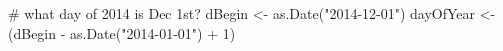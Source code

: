\begin{Schunk}
\begin{Sinput}
 # what day of 2014 is Dec 1st?
 dBegin <- as.Date("2014-12-01")
 dayOfYear <- (dBegin - as.Date("2014-01-01") + 1)
\end{Sinput}
\end{Schunk}
